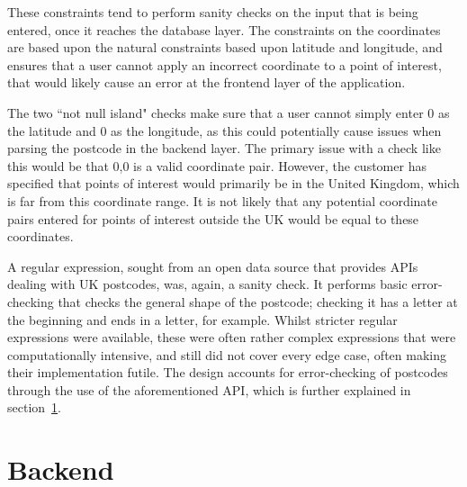 These constraints tend to perform sanity checks on the input that is being entered, once it reaches the database layer. The constraints on the coordinates are based upon the natural constraints based upon latitude and longitude, and ensures that a user cannot apply an incorrect coordinate to a point of interest, that would likely cause an error at the frontend layer of the application.

The two ``not null island" checks make sure that a user cannot simply enter 0 as the latitude and 0 as the longitude, as this could potentially cause issues when parsing the postcode in the backend layer. The primary issue with a check like this would be that 0,0 is a valid coordinate pair. However, the customer has specified that points of interest would primarily be in the United Kingdom, which is far from this coordinate range. It is not likely that any potential coordinate pairs entered for points of interest outside the UK would be equal to these coordinates.

A regular expression, sought from an open data source that provides APIs dealing with UK postcodes\cite{PostcodeRegex}, was, again, a sanity check. It performs basic error-checking that checks the general shape of the postcode; checking it has a letter at the beginning and ends in a letter, for example. Whilst stricter regular expressions were available, these were often rather complex expressions that were computationally intensive, and still did not cover every edge case, often making their implementation futile. The design accounts for error-checking of postcodes through the use of the aforementioned API, which is further explained in section~\ref{sec:backend}. 


\section{Backend}
\label{sec:backend}

